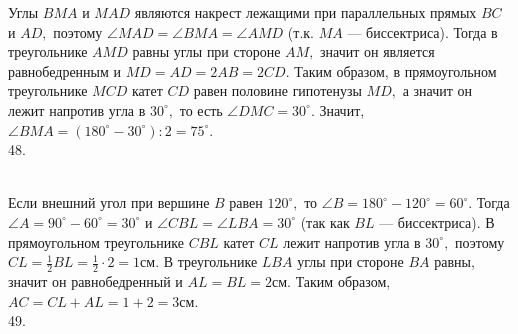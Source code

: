 \documentclass[12pt]{article}
\begin{document}
Углы $BMA$ и $MAD$ являются накрест лежащими при параллельных прямых $BC$ и $AD,$ поэтому $\angle MAD=\angle BMA=\angle AMD$ (т.к. $MA$ --- биссектриса). Тогда в треугольнике $AMD$ равны углы при стороне $AM,$ значит он является равнобедренным и $MD=AD=2AB=2CD.$ Таким образом, в прямоугольном треугольнике $MCD$ катет $CD$ равен половине гипотенузы $MD,$ а значит он лежит напротив угла в $30^\circ,$ то есть $\angle DMC=30^\circ.$ Значит, $\angle BMA=(180^\circ-30^\circ):2=75^\circ.$\\
48. \begin{figure}[ht!]
\end{figure}\\
Если внешний угол при вершине $B$ равен $120^\circ,$ то $\angle B=180^\circ-120^\circ=60^\circ.$ Тогда $\angle A=90^\circ-60^\circ=30^\circ$ и $\angle CBL=\angle LBA=30^\circ$ (так как $BL$ --- биссектриса). В прямоугольном треугольнике $CBL$ катет $CL$ лежит напротив угла в $30^\circ,$ поэтому $CL=\frac{1}{2}BL=\frac{1}{2}\cdot2=1$см. В треугольнике $LBA$ углы при стороне $BA$ равны, значит он равнобедренный и $AL=BL=2$см. Таким образом, $AC=CL+AL=1+2=3$см.\\
49. \begin{figure}[ht!]
\end{figure}\\
\end{document}
